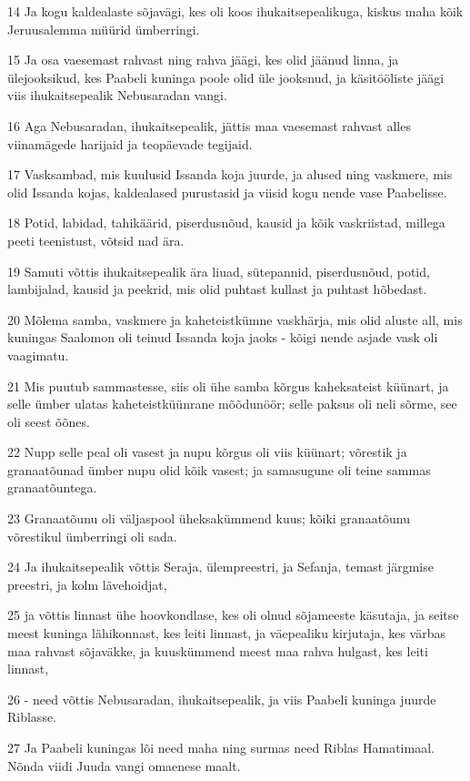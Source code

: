 \par 14 Ja kogu kaldealaste sõjavägi, kes oli koos ihukaitsepealikuga, kiskus maha kõik Jeruusalemma müürid ümberringi.
\par 15 Ja osa vaesemast rahvast ning rahva jäägi, kes olid jäänud linna, ja ülejooksikud, kes Paabeli kuninga poole olid üle jooksnud, ja käsitööliste jäägi viis ihukaitsepealik Nebusaradan vangi.
\par 16 Aga Nebusaradan, ihukaitsepealik, jättis maa vaesemast rahvast alles viinamägede harijaid ja teopäevade tegijaid.
\par 17 Vasksambad, mis kuulusid Issanda koja juurde, ja alused ning vaskmere, mis olid Issanda kojas, kaldealased purustasid ja viisid kogu nende vase Paabelisse.
\par 18 Potid, labidad, tahikäärid, piserdusnõud, kausid ja kõik vaskriistad, millega peeti teenistust, võtsid nad ära.
\par 19 Samuti võttis ihukaitsepealik ära liuad, sütepannid, piserdusnõud, potid, lambijalad, kausid ja peekrid, mis olid puhtast kullast ja puhtast hõbedast.
\par 20 Mõlema samba, vaskmere ja kaheteistkümne vaskhärja, mis olid aluste all, mis kuningas Saalomon oli teinud Issanda koja jaoks - kõigi nende asjade vask oli vaagimatu.
\par 21 Mis puutub sammastesse, siis oli ühe samba kõrgus kaheksateist küünart, ja selle ümber ulatas kaheteistküünrane mõõdunöör; selle paksus oli neli sõrme, see oli seest õõnes.
\par 22 Nupp selle peal oli vasest ja nupu kõrgus oli viis küünart; võrestik ja granaatõunad ümber nupu olid kõik vasest; ja samasugune oli teine sammas granaatõuntega.
\par 23 Granaatõunu oli väljaspool üheksakümmend kuus; kõiki granaatõunu võrestikul ümberringi oli sada.
\par 24 Ja ihukaitsepealik võttis Seraja, ülempreestri, ja Sefanja, temast järgmise preestri, ja kolm lävehoidjat,
\par 25 ja võttis linnast ühe hoovkondlase, kes oli olnud sõjameeste käsutaja, ja seitse meest kuninga lähikonnast, kes leiti linnast, ja väepealiku kirjutaja, kes värbas maa rahvast sõjaväkke, ja kuuskümmend meest maa rahva hulgast, kes leiti linnast,
\par 26 - need võttis Nebusaradan, ihukaitsepealik, ja viis Paabeli kuninga juurde Riblasse.
\par 27 Ja Paabeli kuningas lõi need maha ning surmas need Riblas Hamatimaal. Nõnda viidi Juuda vangi omaenese maalt.
